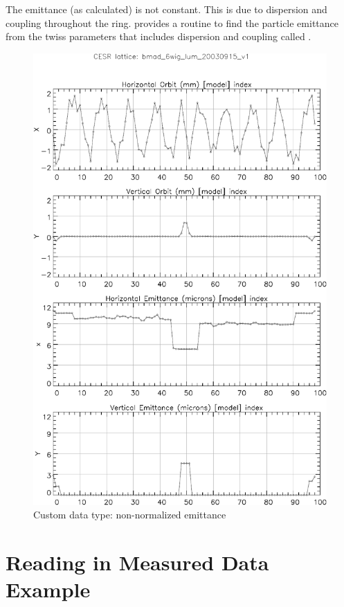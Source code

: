 {{{{The emittance (as calculated) is not constant. This is due to dispersion and coupling throughout the
ring. \bmad provides a routine to find the particle emittance from the twiss parameters that
includes dispersion and coupling called .

\begin{figure}
  \centering
  \includegraphics[width=5in]{plot-emittance.pdf}
  \caption{Custom data type: non-normalized emittance}
  \label{f:plot.emittance}
\end{figure}

\section{Reading in Measured Data Example}
\label{s:cust.read.example}

}}}}
